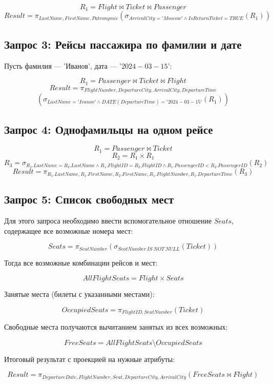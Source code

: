 \documentclass[a4paper,12pt]{article}
\begin{document}
\[
R_1 = Flight \bowtie Ticket \bowtie Passenger
\]
\[
Result = \pi_{LastName, FirstName, Patronymic}(\sigma_{ArrivalCity='Moscow' \land IsReturnTicket=TRUE}(R_1))
\]

\subsection*{Запрос 3: Рейсы пассажира по фамилии и дате}
Пусть фамилия — 'Иванов', дата — '$2024-03-15$':

\[
R_1 = Passenger \bowtie Ticket \bowtie Flight
\]
\[
Result = \pi_{FlightNumber, DepartureCity, ArrivalCity, DepartureTime}
\]
\[
(\sigma_{LastName='Ivanov' \land DATE(DepartureTime)='2024-03-15'}(R_1))
\]

\subsection*{Запрос 4: Однофамильцы на одном рейсе}

\[
R_1 = Passenger \bowtie Ticket
\]
\[
R_2 = R_1 \times R_1
\]
\[
R_3 = \sigma_{R_1.LastName=R_2.LastName \land R_1.FlightID=R_2.FlightID \land R_1.PassengerID < R_2.PassengerID}(R_2)
\]
\[
Result = \pi_{R_1.LastName, R_1.FirstName, R_2.FirstName, R_1.FlightNumber, R_1.DepartureTime}(R_3)
\]

\subsection*{Запрос 5: Список свободных мест}

Для этого запроса необходимо ввести вспомогательное отношение $Seats$, содержащее все возможные номера мест:

\[
Seats = \pi_{SeatNumber}(\sigma_{SeatNumber\ IS\ NOT\ NULL}(Ticket))
\]

Тогда все возможные комбинации рейсов и мест:

\[
AllFlightSeats = Flight \times Seats
\]

Занятые места (билеты с указанными местами):

\[
OccupiedSeats = \pi_{FlightID, SeatNumber}(Ticket)
\]

Свободные места получаются вычитанием занятых из всех возможных:

\[
FreeSeats = AllFlightSeats \setminus OccupiedSeats
\]

Итоговый результат с проекцией на нужные атрибуты:

\[
Result = \pi_{DepartureDate, FlightNumber, Seat, DepartureCity, ArrivalCity}(FreeSeats \bowtie Flight)
\]
\end{document}
